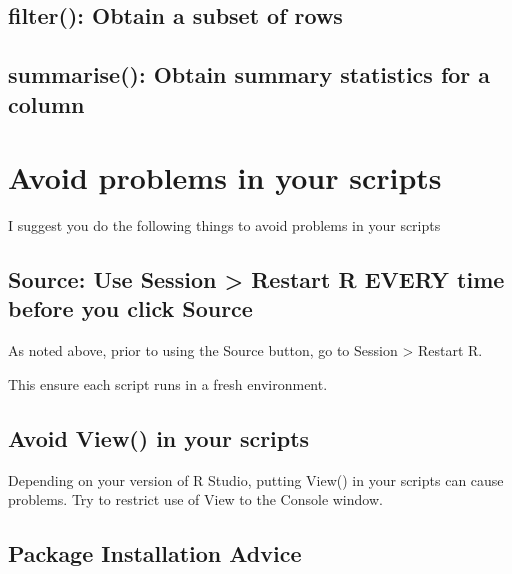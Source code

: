 \documentclass[
]{krantz}
\begin{document}
\hypertarget{filter-obtain-a-subset-of-rows}{%
\subsection{filter(): Obtain a subset of rows}\label{filter-obtain-a-subset-of-rows}}

\hypertarget{summarise-obtain-summary-statistics-for-a-column}{%
\subsection{summarise(): Obtain summary statistics for a column}\label{summarise-obtain-summary-statistics-for-a-column}}

\hypertarget{avoid-problems-in-your-scripts}{%
\section{Avoid problems in your scripts}\label{avoid-problems-in-your-scripts}}

I suggest you do the following things to avoid problems in your scripts

\hypertarget{source-use-session-restart-r-every-time-before-you-click-source-1}{%
\subsection{Source: Use Session \textgreater{} Restart R EVERY time before you click Source}\label{source-use-session-restart-r-every-time-before-you-click-source-1}}

As noted above, prior to using the Source button, go to Session \textgreater{} Restart R.

This ensure each script runs in a fresh environment.

\hypertarget{avoid-view-in-your-scripts}{%
\subsection{Avoid View() in your scripts}\label{avoid-view-in-your-scripts}}

Depending on your version of R Studio, putting View() in your scripts can cause problems. Try to restrict use of View to the Console window.

\hypertarget{package-installation-advice}{%
\subsection{Package Installation Advice}\label{package-installation-advice}}
\end{document}
